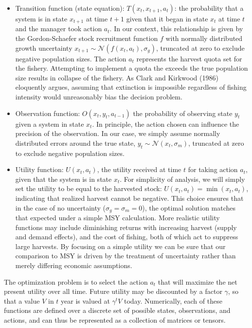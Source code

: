 \documentclass[3p]{elsarticle} %
\begin{document}
\begin{itemize}
\item
  Transition function (state equation): \(T(x_t, x_{t+1}, a_t)\): the
  probability that a system is in state \(x_{t+1}\) at time \(t+1\)
  given that it began in state \(x_t\) at time \(t\) and the manager
  took action \(a_t\). In our context, this relationship is given by the
  Gordon-Schaefer stock recruitment function \(f\) with normally
  distributed growth uncertainty
  \(x_{t+1} \sim \mathcal{N}(f(x_t,a_t), \sigma_g)\), truncated at zero
  to exclude negative population sizes. The action \(a_t\) represents
  the harvest quota set for the fishery. Attempting to implement a quota
  the exceeds the true population size results in collapse of the
  fishery. As Clark and Kirkwood (1986) eloquently argues, assuming that
  extinction is impossible regardless of fishing intensity would
  unreasonably bias the decision problem.
\item
  Observation function: \(O(x_t,y_t,a_{t-1})\) the probability of
  observing state \(y_t\) given a system in state \(x_t\). In principle,
  the action chosen can influence the precision of the observation. In
  our case, we simply assume normally distributed errors around the true
  state, \(y_t \sim \mathcal{N}(x_t, \sigma_m)\), truncated at zero to
  exclude negative population sizes.
\item
  Utility function: \(U(x_t,a_t)\), the utility received at time \(t\)
  for taking action \(a_t\), given that the system is in state \(x_t\).
  For simplicity of analysis, we will simply set the utility to be equal
  to the harvested stock: \(U(x_t, a_t) = \min(x_t, a_t)\), indicating
  that realized harvest cannot be negative. This choice ensures that in
  the case of no uncertainty (\(\sigma_g = \sigma_m = 0\)), the optimal
  solution matches that expected under a simple MSY calculation. More
  realistic utility functions may include diminishing returns with
  increasing harvest (supply and demand effects), and the cost of
  fishing, both of which act to suppress large harvests. By focusing on
  a simple utility we can be sure that our comparison to MSY is driven
  by the treatment of uncertainty rather than merely differing economic
  assumptions.
\end{itemize}

The optimization problem is to select the action \(a_t\) that will
maximize the net present utility over all time. Future utility may be
discounted by a factor \(\gamma\), so that a value \(V\) in \(t\) year
is valued at \(\gamma^t V\) today. Numerically, each of these functions
are defined over a discrete set of possible states, observations, and
actions, and can thus be represented as a collection of matrices or
tensors.
\end{document}
